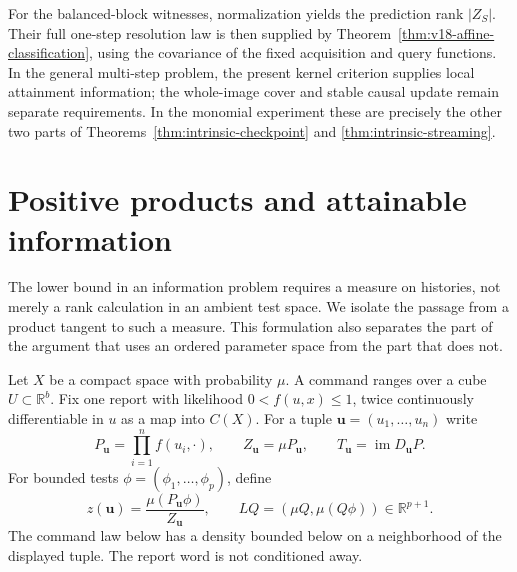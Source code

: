 \documentclass[11pt]{amsart}
\theoremstyle{definition}\newtheorem{definition}[theorem]{Definition}
\theoremstyle{remark}\newtheorem{remark}[theorem]{Remark}
\newcommand{\R}{\mathbb R}\newcommand{\N}{\mathbb N}\newcommand{\C}{\mathbb C}
\begin{document}
For the balanced-block witnesses, normalization yields the prediction
rank $|Z_S|$. Their full one-step resolution law is then supplied by
Theorem~\ref{thm:v18-affine-classification}, using the covariance of the
fixed acquisition and query functions. In the general multi-step problem,
the present kernel criterion supplies local attainment information; the
whole-image cover and stable causal update remain separate requirements.
In the monomial experiment these are precisely the other two parts of
Theorems~\ref{thm:intrinsic-checkpoint} and
\ref{thm:intrinsic-streaming}.

\section{Positive products and attainable information}
\label{sec:positive-history}
The lower bound in an information problem requires a measure on histories,
not merely a rank calculation in an ambient test space. We isolate the
passage from a product tangent to such a measure. This formulation also
separates the part of the argument that uses an ordered parameter space
from the part that does not.

Let $X$ be a compact space with probability $\mu$. A command ranges over
a cube $U\subset\R^b$. Fix one report with likelihood $0<f(u,x)\le1$, twice
continuously differentiable in $u$ as a map into $C(X)$. For a tuple
$\boldsymbol u=(u_1,\ldots,u_n)$ write
\[
 P_{\boldsymbol u}=\prod_{i=1}^nf(u_i,\cdot),\qquad
 Z_{\boldsymbol u}=\mu P_{\boldsymbol u},\qquad
 T_{\boldsymbol u}=\operatorname{im}D_{\boldsymbol u}P.
\]
For bounded tests $\phi=(\phi_1,\ldots,\phi_p)$, define
\[
 z(\boldsymbol u)=\frac{\mu(P_{\boldsymbol u}\phi)}{Z_{\boldsymbol u}},
 \qquad LQ=(\mu Q,\mu(Q\phi))\in\R^{p+1}.
\]
The command law below has a density bounded below on a neighborhood of
the displayed tuple. The report word is not conditioned away.
\end{document}
